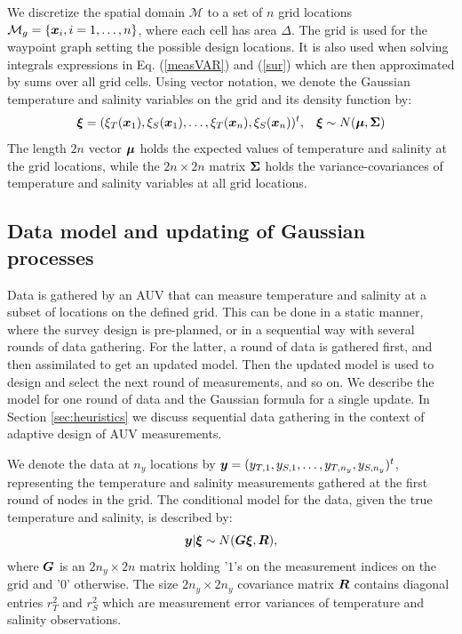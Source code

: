 \documentclass[aoas]{imsart}
\begin{document}
We discretize the spatial domain
$\mathcal{M}$ to a set of $n$ grid locations
$\mathcal{M}_g = \{{\boldsymbol x}_i, i=1,\ldots,n \}$, where each cell has area $\Delta$. The
grid is used for the waypoint graph setting the possible design locations. It is also used when solving integrals expressions in Eq. (\ref{measVAR}) and
(\ref{sur}) which are then approximated by sums over all grid cells.  Using vector
notation, we denote the Gaussian temperature and salinity variables on
the grid and its density function by: 
\begin{equation}\label{prior}
    \bxi = (\xi_T(\bx_1),\xi_S(\bx_1),\ldots,\xi_T(\bx_n),\xi_S(\bx_n))^t, \hspace{3mm}
    \bxi  \sim  N(\bmu, \bSigma) %
\end{equation}
The length $2 n$ vector ${\boldsymbol \mu}$ holds the expected values of
temperature and salinity at the grid locations, while the
$2n \times 2n$ matrix ${\boldsymbol \Sigma}$ holds the
variance-covariances of temperature and salinity variables at all grid
locations.

\subsection{Data model and updating of Gaussian processes}

Data is gathered by an AUV that can measure temperature and salinity
at a subset of locations on the defined grid. This can be done in a
static manner, where the survey design is pre-planned, or in a
sequential way with several rounds of data gathering. For the latter,
a round of data is gathered first, and then assimilated to get an
updated model. Then the updated model is used to design and select the
next round of measurements, and so on. We describe the model for one
round of data and the Gaussian formula for a single update. In Section
\ref{sec:heuristics} we discuss sequential data gathering in the
context of adaptive design of AUV measurements.

We denote the data at $n_y$ locations by
${\boldsymbol y}=(y_{T,1},y_{S,1},\ldots,y_{T,n_y},y_{S,n_y})^t$, representing the
temperature and salinity measurements gathered at the first round of
nodes in the grid. The conditional model for the data, given the true temperature
and salinity, is described by: 
\begin{equation}\label{likelihood}
\by | \bxi \sim N( \bG \bxi, \bR), %
\end{equation}
where ${\boldsymbol G}$ is an $2n_y \times 2n$ matrix holding '$1$'s on the
measurement indices on the grid and '$0$' otherwise. The size
$2n_y \times 2n_y$ covariance matrix ${\boldsymbol R}$ contains diagonal entries
$r^2_T$ and $r^2_S$ which are measurement error variances of
temperature and salinity observations.
\end{document}
